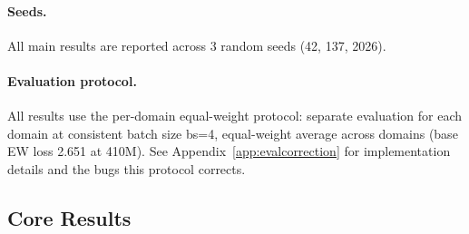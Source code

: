 \documentclass{article}
\begin{document}
\paragraph{Seeds.} All main results are reported across 3 random seeds (42, 137, 2026).

\paragraph{Evaluation protocol.} All results use the per-domain equal-weight protocol: separate evaluation for each domain at consistent batch size bs=4, equal-weight average across domains (base EW loss 2.651 at 410M). See Appendix~\ref{app:evalcorrection} for implementation details and the bugs this protocol corrects.

\subsection{Core Results}
\label{sec:core}
\end{document}
